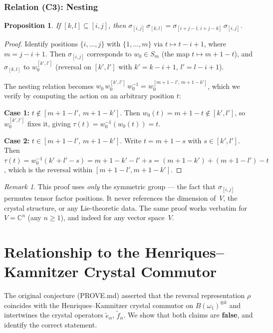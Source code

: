 \documentclass[11pt]{article}
\newtheorem{proposition}[theorem]{Proposition}
\theoremstyle{remark}
\newtheorem{remark}[theorem]{Remark}
\newcommand{\CC}{\mathbb{C}}
\begin{document}
\subsubsection*{Relation (C3): Nesting}

\begin{proposition}
If $[k,l] \subseteq [i,j]$, then
$\sigma_{[i,j]}\, \sigma_{[k,l]} = \sigma_{[i+j-l,\, i+j-k]}\, \sigma_{[i,j]}$.
\end{proposition}

\begin{proof}
Identify positions $\{i, \ldots, j\}$ with $\{1, \ldots, m\}$ via
$t \mapsto t - i + 1$, where $m = j - i + 1$. Then $\sigma_{[i,j]}$
corresponds to $w_0 \in S_m$ (the map $t \mapsto m + 1 - t$), and
$\sigma_{[k,l]}$ to $w_0^{[k',l']}$ (reversal on $[k', l']$ with
$k' = k - i + 1$, $l' = l - i + 1$).

The nesting relation becomes $w_0\, w_0^{[k',l']}\, w_0^{-1} = w_0^{[m+1-l',\, m+1-k']}$,
which we verify by computing the action on an arbitrary position $t$:

\textbf{Case 1:} $t \notin [m+1-l',\, m+1-k']$. Then
$w_0(t) = m+1-t \notin [k',l']$, so $w_0^{[k',l']}$ fixes it, giving
$\tau(t) = w_0^{-1}(w_0(t)) = t$.

\textbf{Case 2:} $t \in [m+1-l',\, m+1-k']$. Write $t = m+1-s$
with $s \in [k',l']$. Then $\tau(t) = w_0^{-1}(k'+l'-s)
= m+1-k'-l'+s = (m+1-k') + (m+1-l') - t$, which is the reversal
within $[m+1-l', m+1-k']$.
\end{proof}

\begin{remark}
This proof uses \emph{only} the symmetric group --- the fact that
$\sigma_{[i,j]}$ permutes tensor factor positions. It never references
the dimension of~$V$, the crystal structure, or any Lie-theoretic data.
The same proof works verbatim for $V = \CC^n$ (any $n \geq 1$), and
indeed for any vector space~$V$.
\end{remark}

\section{Relationship to the Henriques--Kamnitzer Crystal Commutor}
\label{sec:crystal}

The original conjecture (PROVE.md) asserted that the reversal
representation $\rho$ coincides with the Henriques--Kamnitzer crystal
commutor on $B(\omega_1)^{\otimes k}$ and intertwines the crystal
operators $\tilde{e}_\alpha$, $\tilde{f}_\alpha$. We show that both
claims are \textbf{false}, and identify the correct statement.
\end{document}
